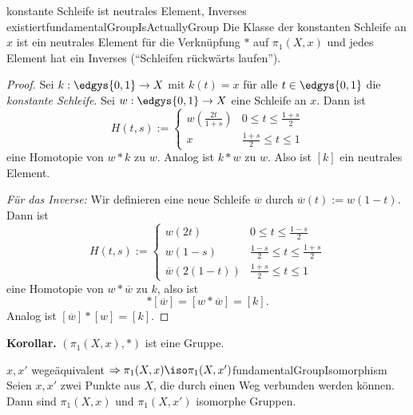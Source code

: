 \documentclass[language=ngerman]{TemplateLecture} %
\begin{document}
\begin{thm}{konstante Schleife ist neutrales Element, Inverses existiert}{fundamentalGroupIsActuallyGroup}
    Die Klasse der konstanten Schleife an $x$ ist ein neutrales Element für die Verknüpfung $*$ auf $\pi_1(X,x)$ und jedes Element hat ein Inverses (\enquote{Schleifen rückwärts laufen}).
\end{thm}
\begin{proof}
    Sei $k: \edgys{0,1} \to X$ mit $k(t) = x$ für alle $t \in \edgys{0,1}$ die \emph{konstante Schleife}. Sei $w: \edgys{0,1} \to X$ eine Schleife an $x$. Dann ist 
    \begin{equation*}
        H(t, s) := \begin{cases}
            w\left(\frac{2t}{1+s}\right) & 0 \leq t \leq \frac{1+s}{2} \\
            x & \frac{1+s}{2} \leq t \leq 1
        \end{cases}
    \end{equation*}
    eine Homotopie von $w * k$ zu $w$. Analog ist $k * w$ zu $w$. Also ist $[k]$ ein neutrales Element.

    \emph{Für das Inverse:} Wir definieren eine neue Schleife $\overline{w}$ durch $\overline{w}(t) := w(1-t)$. Dann ist 
    \begin{equation*}
        H(t, s) := \begin{cases}
            w(2t) & 0 \leq t \leq \frac{1-s}{2} \\
            w(1 - s) & \frac{1-s}{2} \leq t \leq \frac{1+s}{2} \\
            \overline{w}(2(1-t)) & \frac{1+s}{2} \leq t \leq 1
        \end{cases}
    \end{equation*}
    eine Homotopie von $w * \overline{w}$ zu $k$, also ist 
    \begin{equation*}
        [w] * [\overline{w}] = [w * \overline{w}] = [k].
    \end{equation*}
    Analog ist $[\overline{w}] * [w] = [k]$.
\end{proof}

\textbf{Korollar.} $(\pi_1(X,x), *)$ ist eine Gruppe.

\begin{thm}{$x, x'$ wegeäquivalent $\Rightarrow \pi_1(X,x) \iso \pi_1(X,x')$}{fundamentalGroupIsomorphism}
    Seien $x, x'$ zwei Punkte aus $X$, die durch einen Weg verbunden werden können. Dann sind $\pi_1(X,x)$ und $\pi_1(X, x')$ isomorphe Gruppen.
\end{thm}
\end{document}
